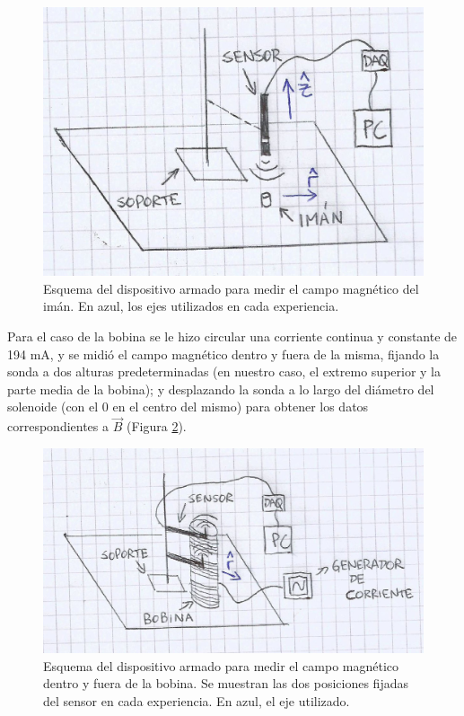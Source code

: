 \documentclass[12pt]{article}
\begin{document}
\begin{figure}[H]
\includegraphics[scale=0.3]{iman_ejes.jpg}
\centering
\caption{Esquema del dispositivo armado para medir el campo magn\'etico del im\'an. En azul, los ejes utilizados en cada experiencia.}
\label{fig:iman_ejes}
\end{figure} 

Para el caso de la bobina se le hizo circular una corriente continua y constante de 194 mA, y se midi\'o el campo magn\'etico dentro y fuera de la misma, fijando la sonda a dos alturas predeterminadas (en nuestro caso, el extremo superior y la parte media de la bobina); y desplazando la sonda a lo largo del di\'ametro del solenoide (con el 0 en el centro del mismo) para obtener los datos correspondientes a $\vec{B}$ (Figura \ref{fig:bobina_ejes}).

\begin{figure}[H]
\includegraphics[scale=0.25]{bobina_ejes.jpg}
\centering
\caption{Esquema del dispositivo armado para medir el campo magn\'etico dentro y fuera de la bobina. Se muestran las dos posiciones fijadas del sensor en cada experiencia. En azul, el eje utilizado.}
\label{fig:bobina_ejes}
\end{figure} 
\end{document}
